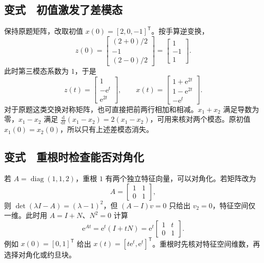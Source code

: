 
\subsection{变式　初值激发了差模态}

保持原题矩阵，改取初值 $x(0)=[2,0,-1]^{\mathsf T}$。按手算逆变换，
\[
 z(0)=\begin{bmatrix}(2+0)/2\\-1\\(2-0)/2\end{bmatrix}
 =\begin{bmatrix}1\\-1\\1\end{bmatrix}.
\]
此时第三模态系数为 $1$，于是
\[
 z(t)=\begin{bmatrix}1\\-\mathrm e^t\\\mathrm e^{2t}\end{bmatrix},
 \qquad
 x(t)=\begin{bmatrix}1+\mathrm e^{2t}\\1-\mathrm e^{2t}\\-\mathrm e^t\end{bmatrix}.
\]
对于原题这类交换对称矩阵，也可直接把前两行相加和相减。$x_1+x_2$ 满足导数为零，$x_1-x_2$ 满足 $\frac{\mathrm d}{\mathrm dt}(x_1-x_2)=2(x_1-x_2)$，可用来核对两个模态。原初值 $x_1(0)=x_2(0)$，所以只有上述差模态消失。

\subsection{变式　重根时检查能否对角化}

若 $A=\operatorname{diag}(1,1,2)$，重根 $1$ 有两个独立特征向量，可以对角化。若矩阵改为
\[
 A=\begin{bmatrix}1&1\\0&1\end{bmatrix},
\]
则 $\det(\lambda I-A)=(\lambda-1)^2$，但 $(A-I)v=0$ 只给出 $v_2=0$，特征空间仅一维。此时用 $A=I+N$、$N^2=0$ 计算
\[
 \mathrm e^{At}=\mathrm e^t(I+tN)=\mathrm e^t\begin{bmatrix}1&t\\0&1\end{bmatrix}.
\]
例如 $x(0)=[0,1]^{\mathsf T}$ 给出 $x(t)=[t\mathrm e^t,\mathrm e^t]^{\mathsf T}$。重根时先核对特征空间维数，再选择对角化或约旦块。
